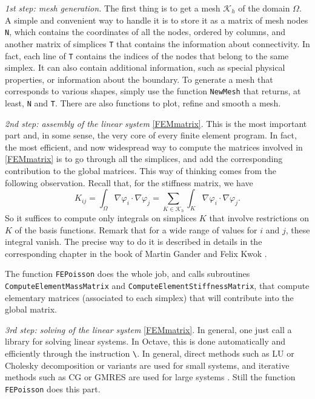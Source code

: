 \documentclass{article}
\begin{document}
\medskip

\emph{1st step: mesh generation.} The first thing is to get a mesh $\mathcal{K}_h$ of the domain $\Omega$. A simple and convenient way to handle it is to store it as a matrix of mesh nodes \texttt{N}, which contains the coordinates of all the nodes, ordered by columns, and another matrix of simplices \texttt{T} that contains the information about connectivity. In fact, each line of \texttt{T} contains the indices of the nodes that belong to the same simplex. It can also contain additional information, such as special physical properties, or information about the boundary. To generate a mesh that corresponds to various shapes, simply use the function \texttt{NewMesh} that returns, at least, \texttt{N} and \texttt{T}.
%
There are also functions to plot, refine and smooth a mesh.

\medskip

\emph{2nd step: assembly of the linear system} \eqref{FEMmatrix}. This is the most important part and, in some sense, the very core of every finite element program. In fact, the most efficient, and now widespread way to compute the matrices involved in \eqref{FEMmatrix} is to go through all the simplices, and add the corresponding contribution to the global matrices. This way of thinking comes from the following observation. Recall that, for the stiffness matrix, we have
\[
K_{ij} = \int_\Omega \nabla \varphi_i \cdot \nabla \varphi_j
= \sum_{K\in\mathcal{K}_h}
\int_K \nabla \varphi_i \cdot \nabla \varphi_j.
\]
So it suffices to compute only integrals on simplices $K$ that involve restrictions on $K$ of the basis functions. Remark that for a wide range of values for $i$ and $j$, these integral vanish. The precise way to do it is described in details in the corresponding chapter in the book of Martin Gander and Felix Kwok \cite{gander18b}. 

The function \texttt{FEPoisson} does the whole job, and calls subroutines \texttt{Compute\-ElementMassMatrix} and \texttt{ComputeElementStiffnessMatrix}, that compute elementary matrices (associated to each simplex) that will contribute into the global matrix.

\medskip

\emph{3rd step: solving of the linear system} \eqref{FEMmatrix}.
In general, one just call a library for solving linear systems. In Octave, this is done automatically and efficiently through the instruction \texttt{\textbackslash}.
In general, direct methods such as LU or Cholesky decomposition or variants are used for small systems, and iterative methods such as CG or GMRES are used for large systems \cite{allaire08,gander14}.
Still the function \texttt{FEPoisson} does this part.
\end{document}
